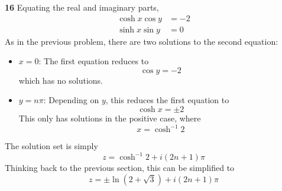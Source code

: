 \documentclass{article}
\begin{document}
\textbf{16}
Equating the real and imaginary parts,
\begin{align*}
	\cosh x \cos y &= -2 \\
	\sinh x \sin y &= 0
\end{align*}
As in the previous problem, there are two solutions to the second equation:
\begin{itemize}
	\item $x = 0$: The first equation reduces to
	\[
		\cos y = -2
	\]
	which has no solutions.
	
	\item $y = n\pi$: Depending on $y$, this reduces the first equation to
	\[
		\cosh x = \pm 2
	\]
	This only has solutions in the positive case, where
	\[
		x = \cosh^{-1} 2
	\]
\end{itemize}
The solution set is simply
\[
	z = \cosh^{-1} 2 + i(2n + 1)\pi
\]
Thinking back to the previous section, this can be simplified to
\[
	z = \pm \ln(2 + \sqrt{3}) + i(2n + 1)\pi
\]
\end{document}

